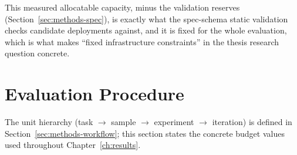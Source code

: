This measured allocatable capacity, minus the validation reserves
(Section~\ref{sec:methods-spec}), is exactly what the spec-schema static
validation checks candidate deployments against, and it is fixed for the
whole evaluation, which is what makes ``fixed infrastructure constraints''
in the thesis research question concrete.


\section{Evaluation Procedure}
\label{sec:setup-procedure}

The unit hierarchy (task $\to$ sample $\to$ experiment $\to$ iteration) is
defined in Section~\ref{sec:methods-workflow}; this section states the
concrete budget values used throughout Chapter~\ref{ch:results}.

